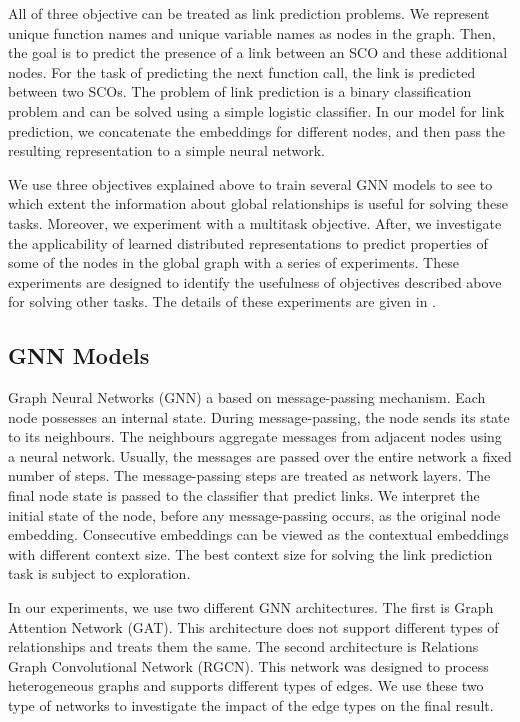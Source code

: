 \documentclass[a4paper,twoside]{article}
\begin{document}
All of three objective can be treated as link prediction problems. We represent unique function names and unique variable names as nodes in the graph. Then, the goal is to predict the presence of a link between an SCO and these additional nodes. For the task of predicting the next function call, the link is predicted between two SCOs. The problem of link prediction is a binary classification problem and can be solved using a simple logistic classifier. In our model for link prediction, we concatenate the embeddings for different nodes, and then pass the resulting representation to a simple neural network.

We use three objectives explained above to train several GNN models to see to which extent the information about global relationships is useful for solving these tasks. Moreover, we experiment with a multitask objective. After, we investigate the applicability of learned distributed representations to predict properties of some of the nodes in the global graph with a series of experiments. These experiments are designed to identify the usefulness of objectives described above for solving other tasks. The details of these experiments are given in .

\subsection{GNN Models}

Graph Neural Networks (GNN) a based on message-passing mechanism. Each node possesses an internal state. During message-passing, the node sends its state to its neighbours. The neighbours aggregate messages from adjacent nodes using a neural network. Usually, the messages are passed over the entire network a fixed number of steps. The message-passing steps are treated as network layers. The final node state is passed to the classifier that predict links. We interpret the initial state of the node, before any message-passing occurs, as the original node embedding. Consecutive embeddings can be viewed as the contextual embeddings with different context size. The best context size for solving the link prediction task is subject to exploration.

In our experiments, we use two different GNN architectures. The first is Graph Attention Network (GAT). This architecture does not support different types of relationships and treats them the same. The second architecture is Relations Graph Convolutional Network (RGCN). This network was designed to process heterogeneous graphs and supports different types of edges. We use these two type of networks to investigate the impact of the edge types on the final result. 
\end{document}
